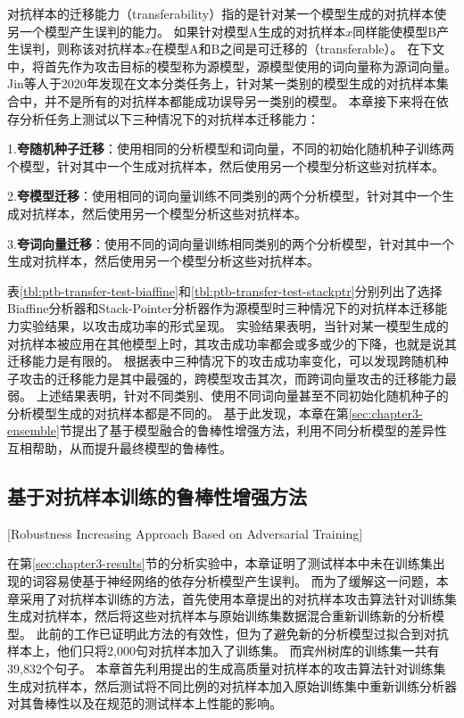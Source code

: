 对抗样本的迁移能力（transferability）指的是针对某一个模型生成的对抗样本使另一个模型产生误判的能力。
如果针对模型A生成的对抗样本$x$同样能使模型B产生误判，则称该对抗样本$x$在模型A和B之间是可迁移的（transferable）。
在下文中，将首先作为攻击目标的模型称为源模型，源模型使用的词向量称为源词向量。
Jin等人\cite{jin-etal-2020-isbert}于2020年发现在文本分类任务上，针对某一类别的模型生成的对抗样本集合中，并不是所有的对抗样本都能成功误导另一类别的模型。
本章接下来将在依存分析任务上测试以下三种情况下的对抗样本迁移能力：

1.\textbf{夸随机种子迁移}：使用相同的分析模型和词向量，不同的初始化随机种子训练两个模型，针对其中一个生成对抗样本，然后使用另一个模型分析这些对抗样本。

2.\textbf{夸模型迁移}：使用相同的词向量训练不同类别的两个分析模型，针对其中一个生成对抗样本，然后使用另一个模型分析这些对抗样本。

3.\textbf{夸词向量迁移}：使用不同的词向量训练相同类别的两个分析模型，针对其中一个生成对抗样本，然后使用另一个模型分析这些对抗样本。

表\ref{tbl:ptb-transfer-test-biaffine}和\ref{tbl:ptb-transfer-test-stackptr}分别列出了选择Biaffine分析器和Stack-Pointer分析器作为源模型时三种情况下的对抗样本迁移能力实验结果，以攻击成功率的形式呈现。
实验结果表明，当针对某一模型生成的对抗样本被应用在其他模型上时，其攻击成功率都会或多或少的下降，也就是说其迁移能力是有限的。
根据表中三种情况下的攻击成功率变化，可以发现跨随机种子攻击的迁移能力是其中最强的，跨模型攻击其次，而跨词向量攻击的迁移能力最弱。
上述结果表明，针对不同类别、使用不同词向量甚至不同初始化随机种子的分析模型生成的对抗样本都是不同的。
基于此发现，本章在第\ref{sec:chapter3-ensemble}节提出了基于模型融合的鲁棒性增强方法，利用不同分析模型的差异性互相帮助，从而提升最终模型的鲁棒性。


\subsection{基于对抗样本训练的鲁棒性增强方法}[Robustness Increasing Approach Based on Adversarial Training]
\label{sec:chapter3-adv-training}

在第\ref{sec:chapter3-results}节的分析实验中，本章证明了测试样本中未在训练集出现的词容易使基于神经网络的依存分析模型产生误判。
而为了缓解这一问题，本章采用了对抗样本训练的方法，首先使用本章提出的对抗样本攻击算法针对训练集生成对抗样本，然后将这些对抗样本与原始训练集数据混合重新训练新的分析模型。
此前的工作\cite{han-etal-2020-adversarial}已证明此方法的有效性，但为了避免新的分析模型过拟合到对抗样本上，他们只将2,000句对抗样本加入了训练集。
而宾州树库的训练集一共有39,832个句子。
本章首先利用提出的生成高质量对抗样本的攻击算法针对训练集生成对抗样本，然后测试将不同比例的对抗样本加入原始训练集中重新训练分析器对其鲁棒性以及在规范的测试样本上性能的影响。

